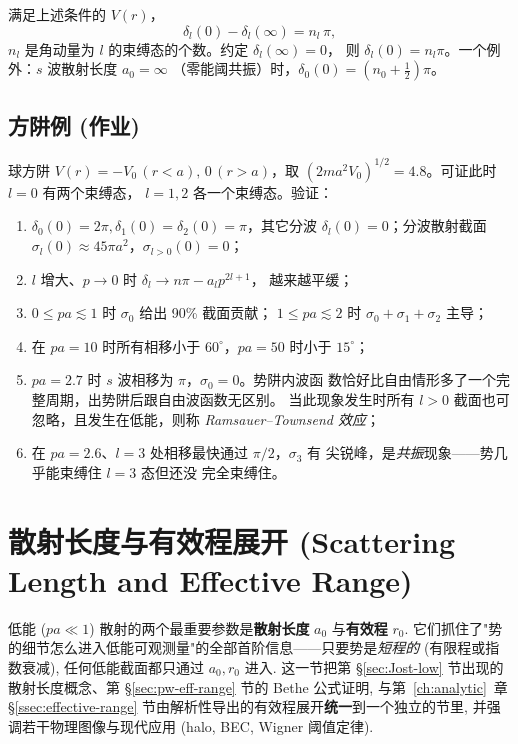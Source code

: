 \begin{theorem}[Levinson 定理（预告）]\label{thm:Levinson}
满足上述条件的 $V(r)$，
\begin{equation}
\delta_l(0)-\delta_l(\infty) = n_l\,\pi,
\end{equation}
$n_l$ 是角动量为 $l$ 的束缚态的个数。约定 $\delta_l(\infty)=0$，
则 $\delta_l(0)=n_l\pi$。一个例外：$s$ 波散射长度 $a_0=\infty$
（零能阈共振）时，$\delta_0(0)=(n_0+\tfrac12)\pi$。
\end{theorem}

\subsection{方阱例 (作业)}

球方阱 $V(r)=-V_0\,(r<a),\,0\,(r>a)$，取
$(2ma^2 V_0)^{1/2}=4.8$。可证此时 $l=0$ 有两个束缚态，
$l=1,2$ 各一个束缚态。验证：
\begin{enumerate}
\item $\delta_0(0)=2\pi,\delta_1(0)=\delta_2(0)=\pi$，其它分波
  $\delta_l(0)=0$；分波散射截面
  $\sigma_l(0)\approx 45\pi a^2$，$\sigma_{l>0}(0)=0$；
\item $l$ 增大、$p\to 0$ 时 $\delta_l\to n\pi-a_l p^{2l+1}$，
  越来越平缓；
\item $0\le pa\lesssim 1$ 时 $\sigma_0$ 给出 90\% 截面贡献；
  $1\le pa\lesssim 2$ 时 $\sigma_0+\sigma_1+\sigma_2$ 主导；
\item 在 $pa=10$ 时所有相移小于 $60^\circ$，$pa=50$ 时小于
  $15^\circ$；
\item $pa=2.7$ 时 $s$ 波相移为 $\pi$，$\sigma_0=0$。势阱内波函
  数恰好比自由情形多了一个完整周期，出势阱后跟自由波函数无区别。
  当此现象发生时所有 $l>0$ 截面也可忽略，且发生在低能，则称
  \emph{Ramsauer--Townsend 效应}；
\item 在 $pa=2.6$、$l=3$ 处相移最快通过 $\pi/2$，$\sigma_3$ 有
  尖锐峰，是\emph{共振}现象——势几乎能束缚住 $l=3$ 态但还没
  完全束缚住。
\end{enumerate}

\section{散射长度与有效程展开 (Scattering Length and Effective Range)}\label{sec:eff-range-main}

低能 ($pa\ll 1$) 散射的两个最重要参数是\textbf{散射长度} $a_0$ 与\textbf{有效程} $r_0$. 它们抓住了"势的细节怎么进入低能可观测量"的全部首阶信息——只要势是\emph{短程的} (有限程或指数衰减), 任何低能截面都只通过 $a_0,r_0$ 进入. 这一节把第 \S\ref{sec:Jost-low} 节出现的散射长度概念、第 \S\ref{sec:pw-eff-range} 节的 Bethe 公式证明, 与第~\ref{ch:analytic}~章 \S\ref{ssec:effective-range} 节由解析性导出的有效程展开\textbf{统一}到一个独立的节里, 并强调若干物理图像与现代应用 (halo, BEC, Wigner 阈值定律).

